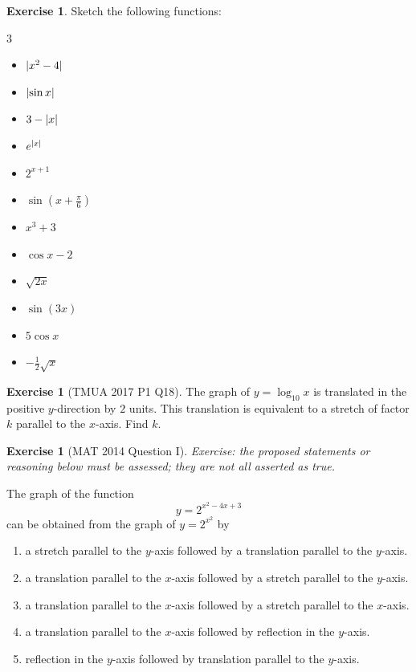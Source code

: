 \documentclass[11pt]{article}
\theoremstyle{definition}
\newtheorem{example}[theorem]{Exercise}
\theoremstyle{remark}
\newcommand{\pqty}[1]{\left(#1\right)}
\DeclarePairedDelimiter{\abs}{\lvert}{\rvert}
\begin{document}
\begin{example}\label{tmua-5-unit-009}
    Sketch the following functions:
    \begin{multicols}{3}
        \begin{itemize}
            \item \(\abs{x^2 - 4}\)
            \item \(\abs{\sin x}\)
            \item \(3 - \abs{x}\)
            \item \(e^{\abs{x}}\)
            \item \(2^{x + 1}\)
            \item \(\sin\pqty{x + \frac{\pi}{6}}\)
            \item \(x^3 + 3\)
            \item \(\cos x - 2\)
            \item \(\sqrt{2x}\)
            \item \(\sin \pqty{3x}\)
            \item \(5 \cos x\)
            \item \(- \frac{1}{2} \sqrt{x}\)
        \end{itemize}
    \end{multicols}
\end{example}

\begin{example}[TMUA 2017 P1 Q18]\label{tmua-5-unit-010}
    The graph of \(y = \log_{10} x\) is translated in the positive \(y\)-direction by \(2\) units. This translation is equivalent to a stretch of factor \(k\) parallel to the \(x\)-axis. Find \(k\).
\end{example}

\begin{example}[MAT 2014 Question I]\label{tmua-5-unit-011}
\textit{Exercise: the proposed statements or reasoning below must be assessed; they are not all asserted as true.}\par

    The graph of the function
    \[
        y = 2^{x^2 - 4x + 3}
    \]
    can be obtained from the graph of \(y = 2^{x^2}\) by
    \begin{enumerate}[label=(\alph*)]
        \item a stretch parallel to the \(y\)-axis followed by a translation parallel to the \(y\)-axis.
        \item a translation parallel to the \(x\)-axis followed by a stretch parallel to the \(y\)-axis.
        \item a translation parallel to the \(x\)-axis followed by a stretch parallel to the \(x\)-axis.
        \item a translation parallel to the \(x\)-axis followed by reflection in the \(y\)-axis.
        \item reflection in the \(y\)-axis followed by translation parallel to the \(y\)-axis.
    \end{enumerate}
\end{example}
\end{document}
